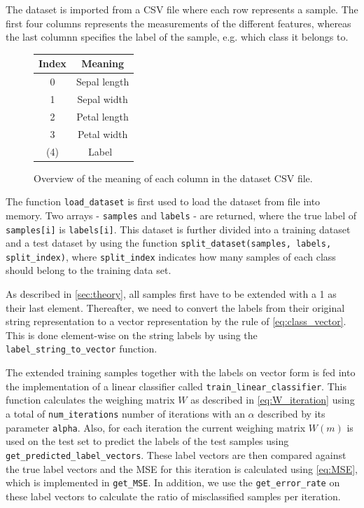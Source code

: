 \documentclass{article}
\begin{document}
The dataset is imported from a CSV file where each row represents a sample. The first four columns
represents the measurements of the different features, whereas the last columnn specifies the label of
the sample, e.g. which class it belongs to.

\begin{figure}
    \centering
    \begin{tabular}{ | c | c | }
        \hline
        Index & Meaning \\
        \hline
        0 & Sepal length \\
        1 & Sepal width \\
        2 & Petal length \\
        3 & Petal width \\
        (4) & Label \\
        \hline
    \end{tabular}
    \caption{Overview of the meaning of each column in the dataset CSV file.}
    \label{tab:class_vectors}
\end{figure}

The function \lstinline{load_dataset} is first used to load the dataset from file into memory.
Two arrays - \lstinline{samples} and \lstinline{labels} - are returned, where the true label of
\lstinline{samples[i]} is \lstinline{labels[i]}. This dataset is further divided into a training
dataset and a test  dataset by using the function \lstinline{split_dataset(samples, labels, split_index)},
where \lstinline{split_index} indicates how many samples of each class should belong to the training
data set.

As described in \autoref{sec:theory}, all samples first have to be extended with a 1 as their last element.
Thereafter, we need to convert the labels from their original string representation to a vector
representation by the rule of \eqref{eq:class_vector}. This is done element-wise on the string labels by
using the \lstinline{label_string_to_vector} function.

The extended training samples together with the labels on vector form is fed into the implementation of
a linear classifier called \lstinline{train_linear_classifier}. This function calculates the weighing matrix
$W$ as described in \eqref{eq:W_iteration} using a total of \lstinline{num_iterations} number of iterations
with an $\alpha$ described by its parameter \lstinline{alpha}. Also, for each iteration the current weighing
matrix $W(m)$ is used on the test set to predict the labels of the test samples using
\lstinline{get_predicted_label_vectors}. These label vectors are then compared against the true
label vectors and the MSE for this iteration is calculated using \eqref{eq:MSE}, which is implemented
in \lstinline{get_MSE}. In addition, we use the \lstinline{get_error_rate} on these label vectors
to calculate the ratio of misclassified samples per iteration.
\end{document}
